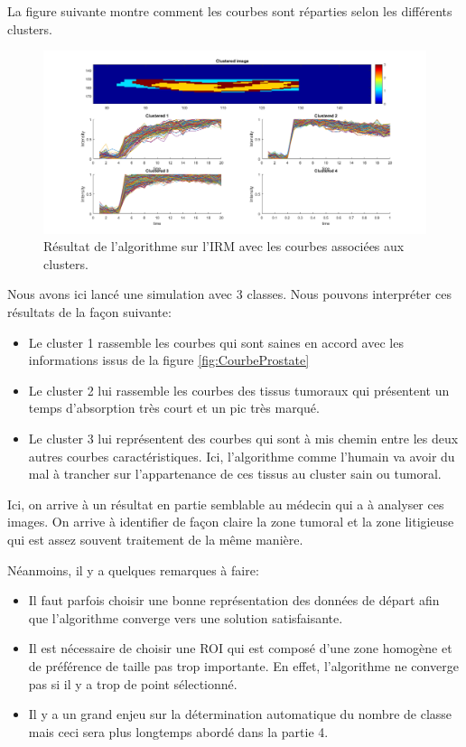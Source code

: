 La figure suivante montre comment les courbes sont réparties selon les différents clusters.

\begin{figure}[H]
\centering
    \includegraphics[scale=0.4,angle=0]{Images/3classProstate.png}
    \caption{Résultat de l'algorithme sur l'IRM avec les courbes associées aux clusters.}
    \label{fig:3classProstate}
\end{figure}

Nous avons ici lancé une simulation avec 3 classes. Nous pouvons interpréter ces résultats de la façon suivante:

\begin{itemize}
\item Le cluster 1 rassemble les courbes qui sont saines en accord avec les informations issus de la figure \ref{fig:CourbeProstate}
\item Le cluster 2 lui rassemble les courbes des tissus tumoraux qui présentent un temps d'absorption très court et un pic très marqué.
\item Le cluster 3 lui représentent des courbes qui sont à mis chemin entre les deux autres courbes caractéristiques. Ici, l'algorithme comme l'humain va avoir du mal à trancher sur l'appartenance de ces tissus au cluster sain ou tumoral.
\end{itemize}

Ici, on arrive à un résultat en partie semblable au médecin qui a à analyser ces images. On arrive à identifier de façon claire la zone tumoral et la zone litigieuse qui est assez souvent traitement de la même manière.

Néanmoins, il y a quelques remarques à faire:

\begin{itemize}
\item Il faut parfois choisir une bonne représentation des données de départ afin que l'algorithme converge vers une solution satisfaisante.
\item Il est nécessaire de choisir une ROI qui est composé d'une zone homogène et de préférence de taille pas trop importante. En effet, l'algorithme ne converge pas si il y a trop de point sélectionné.
\item Il y a un grand enjeu sur la détermination automatique du nombre de classe mais ceci sera plus longtemps abordé dans la partie 4.
\end{itemize}






